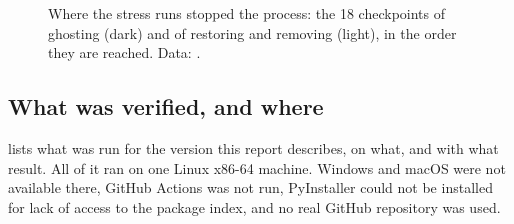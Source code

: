 \begin{figure}[t]
\centering

\caption{Where the stress runs stopped the process: the 18 checkpoints of ghosting (dark) and of
restoring and removing (light), in the order they are reached. Data: .}
\label{fig:crashes}
\end{figure}

\subsection{What was verified, and where}\label{sec:status}
 lists what was run for the version this report describes, on what, and with what
result. All of it ran on one Linux x86-64 machine. Windows and macOS were not available there,
GitHub Actions was not run, PyInstaller could not be installed for lack of access to the package
index, and no real GitHub repository was used.

